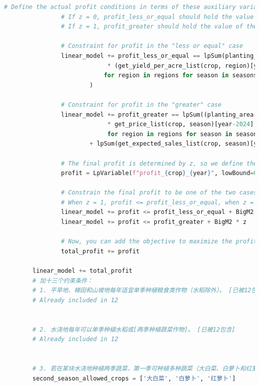 \documentclass{cumcmthesis}
\begin{document}
\begin{appendices}
\begin{lstlisting}[language=python]
                # Define the actual profit conditions in terms of these auxiliary variables
                # If z = 0, profit_less_or_equal should hold the value of the first branch
                # If z = 1, profit_greater should hold the value of the second branch
    
                # Constraint for profit in the "less or equal" case
                linear_model += profit_less_or_equal == lpSum(planting_area[(crop, region, year, season)]
                             * (get_yield_per_acre_list(crop, region)[year-2024] * get_price_list(crop, season)[year-2024] * _risk - get_cost_list(crop, region)[year-2024])
                            for region in regions for season in seasons
                        )
    
                # Constraint for profit in the "greater" case
                linear_model += profit_greater == lpSum((planting_area[(crop, region, year, season)] * get_yield_per_acre_list(crop, region)[year-2024] - get_expected_sales_list(crop, season)[year-2024] - get_cost_list(crop, region)[year-2024])
                             * get_price_list(crop, season)[year-2024] * (1 - reduction_factor) 
                             for region in regions for season in seasons) \
                        + lpSum(get_expected_sales_list(crop, season)[year-2024] * get_price_list(crop, season)[year-2024] for season in seasons)
    
                # The final profit is determined by z, so we define the overall profit
                profit = LpVariable(f"profit_{crop}_{year}", lowBound=0)
    
                # Constrain the final profit to be one of the two cases
                # When z = 1, profit <= profit_less_or_equal, when z = 0, profit <= profit_greater
                linear_model += profit <= profit_less_or_equal + BigM2 * (1 - z)
                linear_model += profit <= profit_greater + BigM2 * z
    
                # Now, you can add the objective to maximize the profit
                total_profit += profit
    
        linear_model += total_profit
        # 加十三个约束条件：
        # 1. 平旱地、梯田和山坡地每年适宜单季种植粮食类作物（水稻除外）。 [已被12包含]
        # Already included in 12
    
    
        # 2. 水浇地每年可以单季种植水稻或[两季种植蔬菜作物]。 [已被12包含]
        # Already included in 12
    
    
        # 3. 若在某块水浇地种植两季蔬菜，第一季可种植多种蔬菜（大白菜、白萝卜和红萝卜除外）；第二季只能种植大白菜、白萝卜和红萝卜中的一种（便于管理）。
        second_season_allowed_crops = ['大白菜', '白萝卜', '红萝卜']
    

\end{lstlisting}
\end{appendices}
\end{document}
